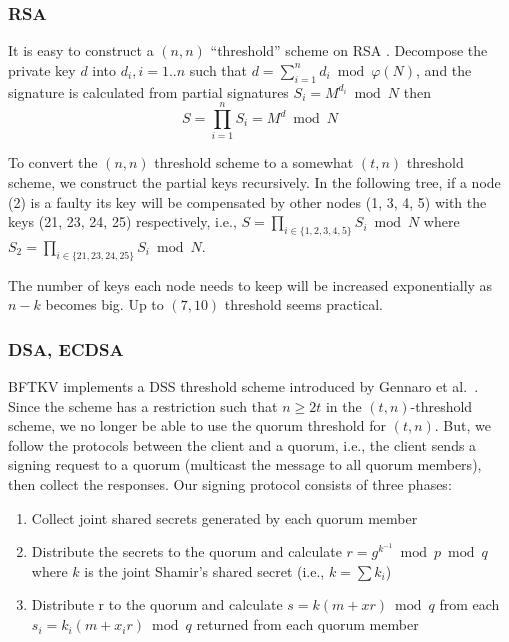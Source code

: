 \subsubsection*{RSA}
It is easy to construct a $(n, n)$ ``threshold'' scheme on RSA
\cite{garay}. Decompose the private key $d$ into $d_i, i = 1..n$ such
that $d = \sum_{i=1}^{n} d_i \bmod \varphi(N)$, and the signature is
calculated from partial signatures $S_i = M^{d_i} \bmod N$ then
\[
  S = \prod_{i=1}^{n} S_i = M^d \bmod N
\]

To convert the $(n, n)$ threshold scheme to a somewhat $(t, n)$
threshold scheme, we construct the partial keys recursively. In the
following tree, if a node (2) is a faulty its key will be compensated
by other nodes (1, 3, 4, 5) with the keys (21, 23, 24, 25)
respectively, i.e., $S = \prod_{i \in \{1,2,3,4,5\}} S_i \bmod N$
where $S_2 = \prod_{i \in \{21,23,24,25\}} S_i \bmod N$.


The number of keys each node needs to keep will be increased
exponentially as $n - k$ becomes big. Up to $(7,10)$ threshold seems
practical.

\subsubsection*{DSA, ECDSA}
BFTKV implements a DSS threshold scheme introduced by Gennaro et
al.\ \cite{Gennaro}.
Since the scheme has a restriction such that $n \geq 2t$ in the $(t,
n)$-threshold scheme, we no longer be able to use the quorum threshold
for $(t, n)$. But, we follow the protocols between the client and a
quorum, i.e., the client sends a signing request to a quorum
(multicast the message to all quorum members), then collect the
responses. Our signing protocol consists of three phases:
\begin{enumerate}
\item Collect joint shared secrets generated by each quorum member
\item Distribute the secrets to the quorum and calculate
  $r=g^{k^{-1}} \bmod p \bmod q$ where $k$ is the
  joint Shamir's shared secret (i.e., $k = \sum k_i$)
\item Distribute r to the quorum and calculate $s=k(m+xr) \bmod q$
  from each $s_i=k_i(m+x_ir) \bmod q$ returned from each quorum member
\end{enumerate}
